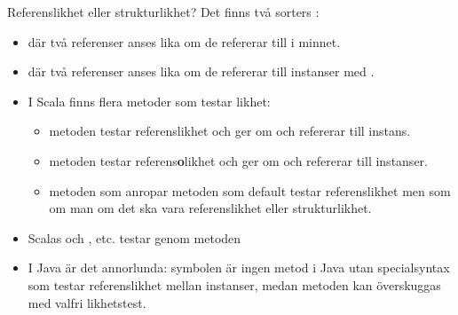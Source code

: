 

\ifkompendium\else

\begin{Slide}{Referenslikhet eller strukturlikhet?}\SlideFontSmall
Det finns två  sorters :
\begin{itemize}
\item {}  där två referenser anses lika om de refererar till  i minnet.
\item {}  där två referenser anses lika om de refererar till instanser med .

\pause

\item I Scala finns flera metoder som testar likhet:
\begin{itemize}\SlideFontSmall
\item metoden  testar referenslikhet och  ger  om  och  refererar till  instans.

\item metoden  testar referens\textbf{o}likhet och  ger  om  och  refererar till  instanser.

\item metoden \code{==} som anropar metoden  som default testar referenslikhet men som  om man  om det ska vara referenslikhet eller strukturlikhet.
\end{itemize}

\pause

\item Scalas  och  ,  etc. testar  genom metoden \code{==}
\pause
\item I Java är det annorlunda: symbolen \code{==} är ingen metod i Java utan specialsyntax som  testar referenslikhet mellan instanser, medan metoden  kan överskuggas med valfri likhetstest.
\end{itemize}
\end{Slide}


